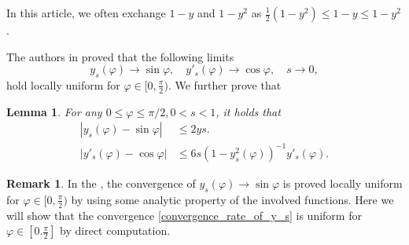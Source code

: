 \documentclass[reqno,10pt]{amsart}
\let\f=\frac
\let\vf=\varphi
\newtheorem{lem}{Lemma}[section]
\theoremstyle{definition}
\newtheorem{rmk}{Remark}[section]
\numberwithin{equation}{section}
\begin{document}
In this article, we often exchange $1-y$ and $1-y^2$ as
$\f12 (1-y^2) \leq 1-y \leq 1-y^2$. 

The authors in \cite{Jang2023-df} proved that the following limits
$$y_s(\vf)\to \sin\vf, \quad y'_s(\vf)\to \cos \vf, \quad s\to 0,$$
hold locally uniform for $\vf\in[0,\frac{\pi}{2})$. We further prove that
\begin{lem} \label{diff-y-and-limit} For any  $0 \leq \vf \leq  \pi/2, 0<s<1$, it holds that
    \begin{align}
    \label{convergence_rate_of_y_s}
    |y_s(\vf)-\sin\vf| &\leq 2ys.
\\
 \label{convergence_rate_of_y'_s}
    |y'_s(\vf)-\cos\vf|&\leq 6s (1-y_s^2(\vf))^{-1} y'_s(\vf).
    \end{align}

\end{lem}
\begin{rmk}
    In the \cite{Jang2023-df}, the convergence of $y_s(\vf)\to \sin\vf$ is proved locally uniform for $\vf\in[0,\frac{\pi}{2})$ by using some analytic property of the involved functions. Here we will show that the convergence \eqref{convergence_rate_of_y_s} is uniform for $\vf\in[0.\frac{\pi}{2}]$ by direct computation.
\end{rmk}
\end{document}
